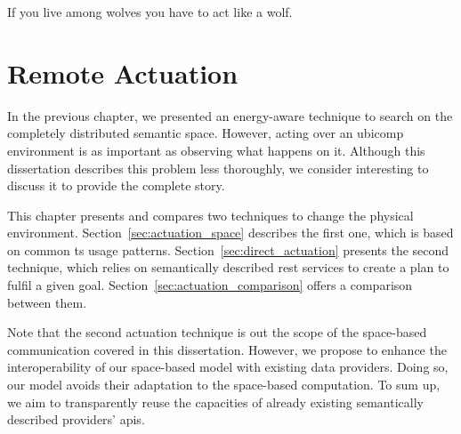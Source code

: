 
\begin{savequote}[50mm]
If you live among wolves you have to act like a wolf.
\end{savequote}


\chapter{Remote Actuation}
\label{cha:actuate}


\newcommand{\restdesc}{\emph{RESTdesc}}



\ifpdf
    \graphicspath{{\pathchapsix/figures/PNG/}{\pathchapsix/figures/PDF/}{\pathchapsix/figures/JPG/}{\pathchapsix/figures/}}
\else
    \graphicspath{{\pathchapsix/figures/EPS/}{\pathchapsix/figures/}}
\fi



In the previous chapter, we presented an energy-aware technique to search on the completely distributed semantic space.
However, acting over an \ac{ubicomp} environment is as important as observing what happens on it.
Although this dissertation describes this problem less thoroughly, we consider interesting to discuss it to provide the complete story. %


This chapter presents and compares two techniques to change the physical environment.
Section~\ref{sec:actuation_space} describes the first one, which is based on common \ac{ts} usage patterns.
Section~\ref{sec:direct_actuation} presents the second technique, which relies on semantically described \ac{rest} services to create a plan to fulfil a given goal.
Section~\ref{sec:actuation_comparison} offers a comparison between them.


Note that the second actuation technique is out the scope of the space-based communication covered in this dissertation.
However, we propose to enhance the interoperability of our space-based model with existing data providers.
Doing so, our model avoids their adaptation to the space-based computation. %
To sum up, we aim to transparently reuse the capacities of already existing semantically described providers' \acsp{api}.


